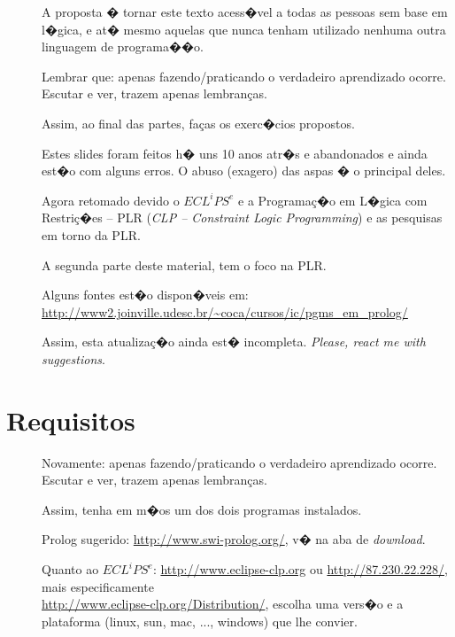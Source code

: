 \documentclass[final,a4paper]{article}
\begin{document}
\begin{description}

\item [] A proposta � tornar este texto acess�vel a
todas as pessoas  sem  base em l�gica, e at�
mesmo aquelas que nunca tenham utilizado nenhuma outra
linguagem de programa��o.

\item [] Lembrar que: apenas fazendo/praticando o verdadeiro
aprendizado ocorre. Escutar e ver, trazem apenas lembran\c{c}as.

\item [] Assim, ao final das partes, fa\c{c}as os
exerc�cios propostos.

\item [] Estes slides foram feitos h� uns 10 anos atr�s e
abandonados e ainda est�o com alguns erros. O abuso (exagero) das aspas � o principal deles.

\item []  Agora retomado devido o $ECL^iPS^e$ e a 
Programa\c{c}�o em L�gica com Restri\c{c}�es -- PLR ({\em CLP -- Constraint Logic Programming}) e as
pesquisas em torno da PLR.

\item [] A segunda parte deste material, tem o foco na PLR.

\item [] Alguns fontes est�o dispon�veis em: \url{http://www2.joinville.udesc.br/~coca/cursos/ic/pgms_em_prolog/}


\item [] Assim, esta  atualiza\c{c}�o ainda est� incompleta. 
{\em Please,  react me with suggestions}.
\end{description}


\section{Requisitos}


\begin{description}


\item [] Novamente: \textsf{apenas fazendo/praticando o verdadeiro
aprendizado ocorre. Escutar e ver, trazem apenas lembran\c{c}as}.

\item [] Assim, tenha em m�os um dos dois programas instalados.

\item [] Prolog sugerido: \url{http://www.swi-prolog.org/}, v� na aba
de {\em download}.

\item [] Quanto ao $ECL^iPS^e$: \url{http://www.eclipse-clp.org} ou 
\url{http://87.230.22.228/}, 
 mais especificamente\\
  \url{http://www.eclipse-clp.org/Distribution/}, escolha
uma vers�o e a plataforma (linux, sun, mac, ..., windows) que lhe
convier.
\end{description}
\end{document}

